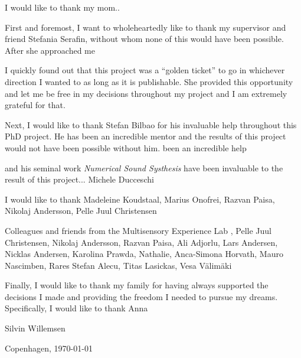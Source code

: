 I would like to thank my mom..

First and foremost, I want to wholeheartedly like to thank my supervisor and friend Stefania Serafin, without whom none of this would have been possible. After she approached me 

I quickly found out that this project was a ``golden ticket'' to go in whichever direction I wanted to as long as it is publishable. She provided this opportunity and let me be free in my decisions throughout my project and I am extremely grateful for that.

Next, I would like to thank Stefan Bilbao for his invaluable help throughout this PhD project. He has been an incredible mentor and the results of this project would not have been possible without him.  been an incredible help


and his seminal work \textit{Numerical Sound Systhesis} have been invaluable to the result of this project...
Michele Ducceschi


I would like to thank Madeleine Koudstaal, Marius Onofrei, Razvan Paisa, Nikolaj Andersson, Pelle Juul Christensen

Colleagues and friends from the Multisensory Experience Lab
, Pelle Juul Christensen, Nikolaj Andersson, Razvan Paisa, Ali Adjorlu, Lars Andersen, Nicklas Andersen, Karolina Prawda, Nathalie, Anca-Simona Horvath, Mauro Nascimben, Rares Stefan Alecu, Titas Lasickas, Vesa V{\"a}lim{\"a}ki


Finally, I would like to thank my family for having always supported the decisions I made and providing the freedom I needed to pursue my dreams. Specifically, I would like to thank Anna


\vfill
\hfill Silvin Willemsen

\hfill Copenhagen, \today
